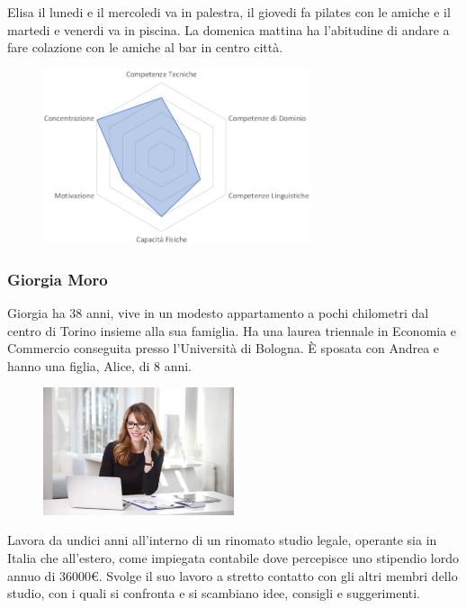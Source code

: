 \documentclass[12pt,italian,]{report}
\begin{document}
Elisa il lunedi e il mercoledi va in palestra, il giovedi fa pilates con
le amiche e il martedi e venerdi va in piscina. La domenica mattina ha
l'abitudine di andare a fare colazione con le amiche al bar in centro
città.

\begin{figure}[h]
\centering
\includegraphics[width=0.7\textwidth,height=\textheight]{img/elisa_competenze.png}
\end{figure}

\subsubsection{Giorgia Moro}\label{giorgia-moro-1}



Giorgia ha 38 anni, vive in un modesto appartamento a pochi chilometri
dal centro di Torino insieme alla sua famiglia. Ha una laurea triennale
in Economia e Commercio conseguita presso l'Università di Bologna. È
sposata con Andrea e hanno una figlia, Alice, di 8 anni.

\begin{figure}[h]
\centering
\includegraphics[width=0.5\textwidth,height=\textheight]{img/giorgia.jpg}
\end{figure}

Lavora da undici anni all'interno di un rinomato studio legale, operante
sia in Italia che all'estero, come impiegata contabile dove percepisce
uno stipendio lordo annuo di 36000€. Svolge il suo lavoro a stretto
contatto con gli altri membri dello studio, con i quali si confronta e
si scambiano idee, consigli e suggerimenti.
\end{document}
